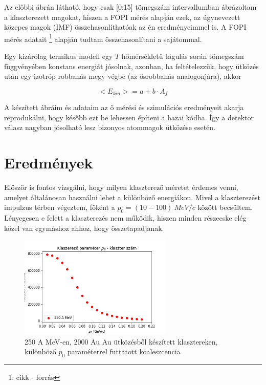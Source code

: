 \documentclass[a4paper,12pt]{article}
\begin{document}
\par Az előbbi ábrán látható, hogy csak [0;15] tömegszám intervallumban ábrázoltam a klaszterezett magokat, hiszen a FOPI mérés alapján ezek, az úgynevezett közepes magok (IMF) összehasonlíthatóak az én eredményeimmel is. A FOPI mérés adatait \footnote{cikk - forrás} alapján tudtam összehasonlítani a sajátommal.

\par Egy kizárólag termikus modell egy $T$ hőmérsékletű tágulás során tömegszám függvényében konstans energiát jósolnak, azonban, ha feltételezzük, hogy ütközés után egy izotróp robbanás megy végbe (az ősrobbanás analogonjára), akkor 

\begin{equation*}
<E_{kin}> = a + b\cdot A_{f}
\end{equation*}

\par A készített ábráim és adataim az ő mérési és szimulációs eredményeit akarja reprodukálni, hogy később ezt be lehessen építeni a hazai kódba. Így a detektor válasz nagyban jósolható lesz bizonyos atommagok ütközése esetén.

\section{ Eredmények}

\par Először is fontos vizsgálni, hogy milyen klaszterező méretet érdemes venni, amelyet általánosan használni lehet a különböző energiákon. Mivel a klaszterezést impulzus térben végeztem, főként a $p_{0} = (10 - 100) ~MeV/c$ között becsültem. Lényegesen e felett a klaszterezés nem működik, hiszen minden részecske elég közel van egymáshoz ahhoz, hogy összetapadjanak. 

\begin{figure}[!htb]
\centering
\includegraphics[width=0.65\textwidth]{./klaszterszamparameter.png}
\caption{250 A MeV-en, 2000 Au Au ütközésből készített klasztereken, különböző $p_{0}$ paraméterrel futtatott koaleszcencia}
\end{figure}
\end{document}
